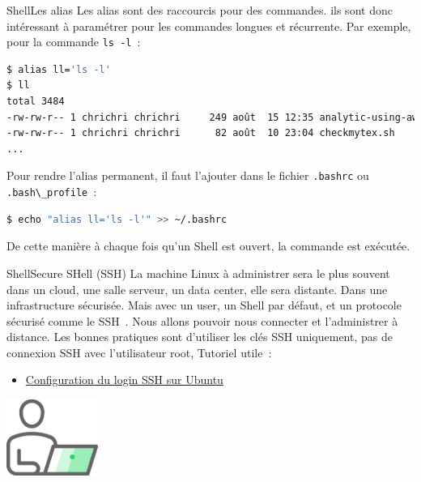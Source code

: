 \documentclass{beamer}
\begin{document}
    \begin{frame}[fragile]{Shell}{Les alias}
        Les alias sont des raccourcis pour des commandes.
        ils sont donc intéressant à paramétrer pour les commandes longues et récurrente.
        \bigbreak
        Par exemple, pour la commande \lstinline{ls -l}~:
        \begin{lstlisting}[language=bash]
$ alias ll='ls -l'
$ ll
total 3484
-rw-rw-r-- 1 chrichri chrichri     249 août  15 12:35 analytic-using-awk.sh
-rw-rw-r-- 1 chrichri chrichri      82 août  10 23:04 checkmytex.sh
...
        \end{lstlisting}
        \bigbreak
        Pour rendre l'alias permanent, il faut l'ajouter dans le fichier \lstinline{.bashrc} ou \lstinline{.bash\_profile}~:
        \begin{lstlisting}[language=bash]
$ echo "alias ll='ls -l'" >> ~/.bashrc
        \end{lstlisting}
        De cette manière à chaque fois qu'un Shell est ouvert, la commande est exécutée.
    \end{frame}

    \begin{frame}{Shell}{Secure SHell (SSH)}
        La machine Linux à administrer sera le plus souvent dans un cloud, une salle serveur, un data center, elle sera distante.
        Dans une infrastructure sécurisée.
        \bigbreak
        Mais avec un user, un Shell par défaut, et un protocole sécurisé comme le SSH~.
        Nous allons pouvoir nous connecter et l'administrer à distance.
        \bigbreak
        Les bonnes pratiques sont d'utiliser les clés SSH uniquement, pas de connexion SSH avec l'utilisateur root,
        Tutoriel utile~:
        \begin{itemize}
            \item \href{https://phoenixnap.com/kb/generate-setup-ssh-key-ubuntu}{Configuration du login SSH sur Ubuntu}
        \end{itemize}
        \bigbreak
        \centering
        \includegraphics[width=3cm]{image/guy-in-front-of-desktop}
    \end{frame}
\end{document}
